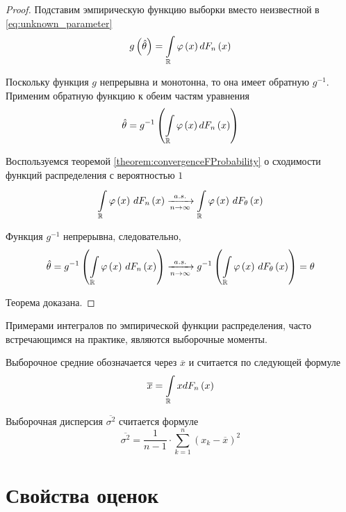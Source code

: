\begin{proof}
  Подставим эмпирическую функцию выборки вместо неизвестной в
  \eqref{eq:unknown_parameter}
  \begin{equation*}
    g\left(\hat{\theta}\right)
      =\int\limits_{\mathbb{R}} \varphi\left(x\right)d\cdfn{x}
  \end{equation*}

  Поскольку функция $g$ непрерывна и монотонна,
  то она имеет обратную $g^{-1}$.
  Применим обратную функцию к обеим частям уравнения
  $$\hat{\theta}
      =g^{-1}\left(
        \int\limits_{\mathbb{R}}\varphi\left(x\right)d\cdfn{x}\right)$$

  Воспользуемся теоремой \ref{theorem:convergenceFProbability} о сходимости
  функций распределения с вероятностью $1$
  $$\integrall{\mathbb{R}}{d\cdfn{x}}{\varphi\left( x \right)}
    \acovergence
      \integrall{\mathbb{R}}{d\cdfof{\theta}{x}}{
        \varphi\left( x \right)}$$

  Функция $g^{-1}$ непрерывна, следовательно,
  \begin{equation*}
  \hat{\theta}
  = g^{-1}\left( \integrall{\mathbb{R}}{
    d\cdfn{x}}{\varphi\left( x \right)} \right)
  \acovergence
    g^{-1}\left( \integrall{\mathbb{R}}{
      d\cdfof{\theta}{x}}{\varphi\left( x \right)} \right)
  = \theta
  \end{equation*}

  Теорема доказана.
\end{proof}

Примерами интегралов по эмпирической функции распределения, часто встречающимся
на практике, являются выборочные моменты.

\begin{definition}
  Выборочное средние обозначается через $\overline{x}$
  и считается по следующей формуле
  $$\overline{x}=\int\limits_{\mathbb{R}}xd\cdfn{x}$$
\end{definition}

\begin{definition}
  Выборочная дисперсия $\overline{\sigma^2}$
  считается формуле
  $$\overline{\sigma^2}
    =\frac{1}{n-1}\cdot\sum_{k=1}^n \left(x_k-\overline{x}\right)^2$$
\end{definition}

\section{Свойства оценок}
